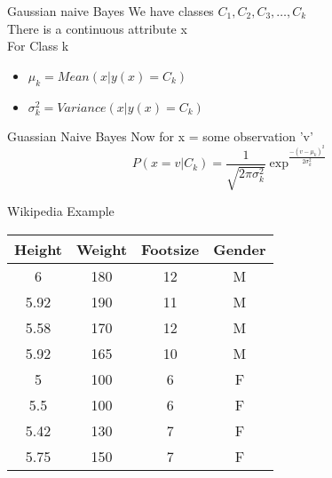 \documentclass{beamer}
\begin{document}
\begin{frame}{Gaussian naive Bayes}
    We have classes $C_{1}, C_{2}, C_{3},\dots, C_{k}$\\
    There is a continuous attribute x\\
    For Class k 
    \begin{itemize}
        \item $\mu_{k} = Mean(x \vert y(x) = C_{k})$
        \item $\sigma_{k}^{2} = Variance(x \vert y(x)=C_{k})$
    \end{itemize}
    
\end{frame}

\begin{frame}{Guassian Naive Bayes}
    Now for x = some observation 'v'\\
    \begin{equation*}
        P(x=v\vert C_{k}) = \frac{1}{\sqrt{2\pi \sigma_{k}^{2}}} \exp^{\frac{-(v-\mu_{k})^{2}}{2\sigma_{k}^{2}}}
    \end{equation*}
\end{frame}

\begin{frame}{Wikipedia Example}

    \begin{center}
    \begin{tabular}{|c|c|c|c|}
    \hline
    Height&Weight&Footsize&Gender\\
    \hline
    \hline
         6 & 180& 12& M \\
         5.92 & 190& 11& M \\
         5.58 & 170& 12& M \\
         5.92 & 165& 10& M \\
         5 & 100& 6& F \\
         5.5 & 100& 6& F \\
         5.42 & 130& 7& F \\
         5.75 & 150& 7& F \\
         \hline
    \end{tabular}
    
    \end{center}
    
\end{frame}
\end{document}
